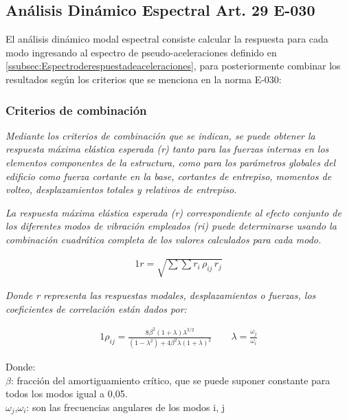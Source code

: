 \documentclass{article}%
\begin{document}
%
\subsection{Análisis Dinámico Espectral Art. 29 E{-}030}%
\label{subsec:AnlisisDinmicoEspectralArt.29E{-}030}%
El análisis dinámico modal espectral consiste calcular la respuesta para cada modo ingresando al espectro de pseudo-aceleraciones definido en \ref{ssubsec:Espectroderespuestadeaceleraciones}, para posteriormente combinar los resultados según los criterios que se menciona en la norma E-030:%

%
\subsubsection{Criterios de combinación}%
\label{ssubsec:Criteriosdecombinacin}%
\begin{tcolorbox}[colback=gray!5!white,colframe=Maroon!75!black,fonttitle=\bfseries,title=Art. 29.3.1]%
\textit{Mediante los criterios de combinación que se indican, se puede obtener la respuesta máxima elástica esperada (r) tanto para las fuerzas internas en los elementos componentes de la estructura, como para los parámetros globales  del edificio como fuerza cortante en la base, cortantes de entrepiso, momentos  de volteo, desplazamientos totales y relativos de entrepiso.}%
\end{tcolorbox}%
\begin{tcolorbox}[colback=gray!5!white,colframe=Maroon!75!black,fonttitle=\bfseries,title=Art. 29.3.2]%
\textit{La respuesta máxima elástica esperada (r) correspondiente al efecto conjunto  de  los  diferentes  modos  de  vibración  empleados  (ri)  puede determinarse usando la combinación cuadrática completa de los valores calculados para cada modo.}%
\end{tcolorbox}%
\begin{alignat}{1}%
r=\sqrt{\sum \sum r_{i}\,\rho _{ij}\,r_{j}}%
\end{alignat}%
\begin{tcolorbox}[colback=gray!5!white,colframe=Maroon!75!black,fonttitle=\bfseries,title=Art. 29.3.3]%
\textit{Donde r representa las respuestas modales, desplazamientos o fuerzas, los coeficientes de correlación están dados por:}%
\end{tcolorbox}%
\begin{alignat}{1}%
\rho_{ij}=\frac{8\beta ^{2}\left ( 1+\lambda  \right )\lambda ^{3/2}}{\left ( 1-\lambda ^{2} \right )+4\beta ^{2}\lambda \left ( 1+\lambda  \right )^{2}}\quad\quad  \lambda =\frac{\omega _{j}}{\omega _{i}}%
\end{alignat}%
\begin{flushleft}%
Donde:\\%
$\beta$: fracción del amortiguamiento crítico, que se puede suponer constante para todos los modos igual a 0,05.\\%
$\omega _{j}$,$\omega _{i}$: son las frecuencias angulares de los modos i, j\\%
\end{flushleft}
\end{document}
